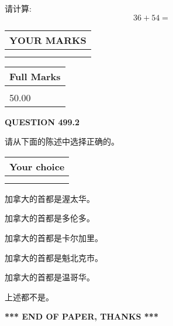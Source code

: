 \documentclass{ctexart}
\begin{document}
  
 
请计算:
\begin{equation}
36 +  %
54 = \nonumber
\end{equation}
 

 

 
  
\vspace{0.2in}
  
\noindent\begin{tabular}{|l|}
\hline
 YOUR MARKS  \\
\hline
 \\ 
 \\ 
\hline
\end{tabular}
\hspace{0.05in} \begin{tabular}{|l|}
\hline
 Full Marks  \\
\hline
 \\ 
50.00 \\
\hline
\end{tabular}
{\textbf{\Large{QUESTION
499.2 
}}}
  
  
请从下面的陈述中选择正确的。
  
  
\noindent\hspace{3.0in} \begin{tabular}{|l|}
\hline
Your choice \\
\hline
 \\ 
 \\ 
\hline
\end{tabular}
  
  
 
 
加拿大的首都是渥太华。
 
 
加拿大的首都是多伦多。
 
 
加拿大的首都是卡尔加里。
 
 
加拿大的首都是魁北克市。
 
 
加拿大的首都是温哥华。
 
 
 上述都不是。
 
 
   
   
 \vspace{0.2in}
 
   
   
   
   
\vspace{1.0in} 
{\textbf{\large{ *** END OF PAPER, THANKS *** }}} 
   
\end{document}
